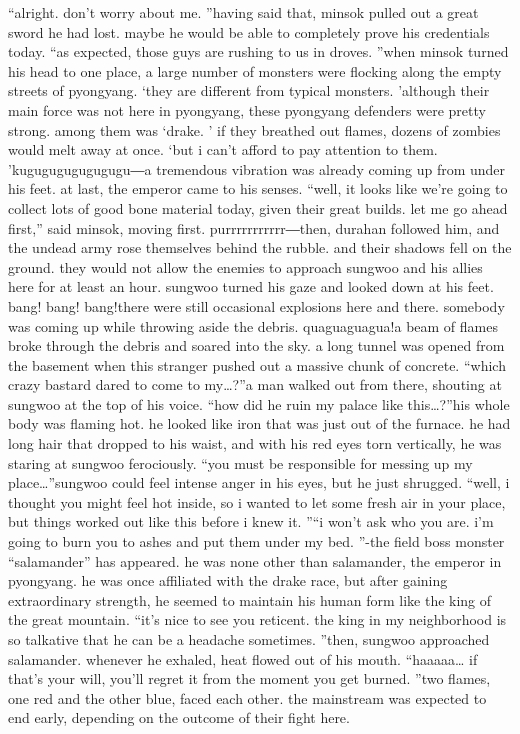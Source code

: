 “alright.
 don’t worry about me.
”having said that, minsok pulled out a great sword he had lost.
 maybe he would be able to completely prove his credentials today.
“as expected, those guys are rushing to us in droves.
”when minsok turned his head to one place, a large number of monsters were flocking along the empty streets of pyongyang.
‘they are different from typical monsters.
’although their main force was not here in pyongyang, these pyongyang defenders were pretty strong.
 among them was ‘drake.
’ if they breathed out flames, dozens of zombies would melt away at once.
‘but i can’t afford to pay attention to them.
’kugugugugugugugu―a tremendous vibration was already coming up from under his feet.
at last, the emperor came to his senses.
“well, it looks like we’re going to collect lots of good bone material today, given their great builds.
 let me go ahead first,” said minsok, moving first.
purrrrrrrrrrr―then, durahan followed him, and the undead army rose themselves behind the rubble.
and their shadows fell on the ground.
 they would not allow the enemies to approach sungwoo and his allies here for at least an hour.
sungwoo turned his gaze and looked down at his feet.
bang! bang! bang!there were still occasional explosions here and there.
 somebody was coming up while throwing aside the debris.
quaguaguagua!a beam of flames broke through the debris and soared into the sky.
a long tunnel was opened from the basement when this stranger pushed out a massive chunk of concrete.
“which crazy bastard dared to come to my…?”a man walked out from there, shouting at sungwoo at the top of his voice.
“how did he ruin my palace like this…?”his whole body was flaming hot.
 he looked like iron that was just out of the furnace.
he had long hair that dropped to his waist, and with his red eyes torn vertically, he was staring at sungwoo ferociously.
“you must be responsible for messing up my place…”sungwoo could feel intense anger in his eyes, but he just shrugged.
“well, i thought you might feel hot inside, so i wanted to let some fresh air in your place, but things worked out like this before i knew it.
”“i won’t ask who you are.
 i’m going to burn you to ashes and put them under my bed.
”-the field boss monster “salamander” has appeared.
he was none other than salamander, the emperor in pyongyang.
 he was once affiliated with the drake race, but after gaining extraordinary strength, he seemed to maintain his human form like the king of the great mountain.
“it’s nice to see you reticent.
 the king in my neighborhood is so talkative that he can be a headache sometimes.
”then, sungwoo approached salamander.
 whenever he exhaled, heat flowed out of his mouth.
“haaaaa… if that’s your will, you’ll regret it from the moment you get burned.
”two flames, one red and the other blue, faced each other.
the mainstream was expected to end early, depending on the outcome of their fight here.


